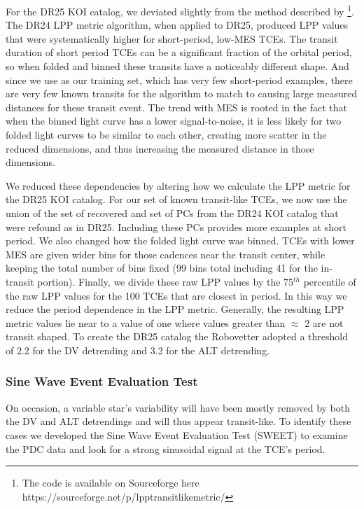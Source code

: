 For the DR25 KOI catalog, we deviated slightly from the method described by \citet{Thompson2015b}\footnote{The code is available on Sourceforge here https://sourceforge.net/p/lpptransitlikemetric/}.  The DR24 LPP metric algorithm, when applied to DR25, produced LPP values that were systematically higher for short-period, low-MES TCEs. The transit duration of short period TCEs can be a significant fraction of the orbital period, so when folded and binned these transits have a noticeably different shape. And since we use  as our training set, which has very few short-period examples, there are very few known transits for the algorithm to match to causing large measured distances for these transit event. The trend with MES is rooted in the fact that when the binned light curve has a lower signal-to-noise, it is less likely for two folded light curves to be similar to each other, creating more scatter in the reduced dimensions, and thus increasing the measured distance in those dimensions.  

We reduced these dependencies by altering how we calculate the LPP metric for the DR25 KOI catalog. For our set of known transit-like TCEs, we now use the union of the set of recovered  and set of PCs from the DR24 KOI catalog \citep{Coughlin2016} that were refound as  in DR25. Including these PCs provides more examples at short period. We also changed how the folded light curve was binned. TCEs with lower MES are given wider bins for those cadences near the transit center, while keeping the total number of bins fixed (99 bins total including 41 for the in-transit portion). Finally, we divide these raw LPP values by the 75$^{th}$ percentile of the raw LPP values for the 100 TCEs that are closest in period.  In this way we reduce the period dependence in the LPP metric.  Generally, the resulting LPP metric values lie near to a value of one where values greater than $\approx$ 2 are not transit shaped.  To create the DR25 catalog the Robovetter adopted a threshold of 2.2 for the DV detrending and 3.2 for the ALT detrending.





\subsubsection{Sine Wave Event Evaluation Test}
\label{s:sweetntl}

On occasion, a variable star's variability will have been mostly removed by both the DV and ALT detrendings and will thus appear transit-like. To identify these cases we developed the Sine Wave Event Evaluation Test (SWEET) to examine the PDC data and look for a strong sinusoidal signal at the TCE's period. 

